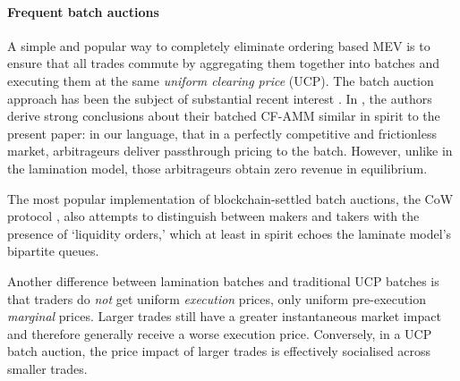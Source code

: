 \paragraph{Frequent batch auctions}
A simple and popular way to completely eliminate ordering based MEV is to ensure that all trades commute by aggregating them together into batches and executing them at the same \emph{uniform clearing price} (UCP).
%
The batch auction approach has been the subject of substantial recent interest \cite{budish2015high, cowprotocoloverview, gong2023order, canidio2023arbitrageurs}.
%
In \cite{canidio2023arbitrageurs}, the authors derive strong conclusions about their batched CF-AMM similar in spirit to the present paper: in our language, that in a perfectly competitive and frictionless market, arbitrageurs deliver passthrough pricing to the batch.
%
However, unlike in the lamination model, those arbitrageurs obtain zero revenue in equilibrium.

The most popular implementation of blockchain-settled batch auctions, the CoW protocol \cite{cowprotocoloverview}, also attempts to distinguish between makers and takers with the presence of `liquidity orders,' which at least in spirit echoes the laminate model's bipartite queues.

Another difference between lamination batches and traditional UCP batches is that traders do \emph{not} get uniform \emph{execution} prices, only uniform pre-execution \emph{marginal} prices.
%
Larger trades still have a greater instantaneous market impact and therefore generally receive a worse execution price.
%
Conversely, in a UCP batch auction, the price impact of larger trades is effectively socialised across smaller trades.


